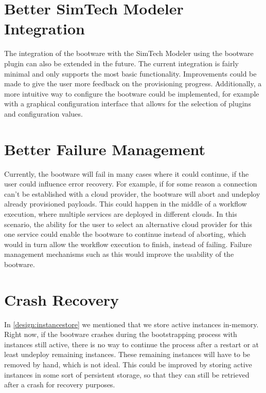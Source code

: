 \section{Better SimTech Modeler Integration}

The integration of the bootware with the SimTech Modeler using the bootware plugin can also be extended in the future.
The current integration is fairly minimal and only supports the most basic functionality.
Improvements could be made to give the user more feedback on the provisioning progress.
Additionally, a more intuitive way to configure the bootware could be implemented, for example with a graphical configuration interface that allows for the selection of plugins and configuration values.

\section{Better Failure Management}

Currently, the bootware will fail in many cases where it could continue, if the user could influence error recovery.
For example, if for some reason a connection can't be established with a cloud provider, the bootware will abort and undeploy already provisioned payloads.
This could happen in the middle of a workflow execution, where multiple services are deployed in different clouds.
In this scenario, the ability for the user to select an alternative cloud provider for this one service could enable the bootware to continue instead of aborting, which would in turn allow the workflow execution to finish, instead of failing.
Failure management mechanisms such as this would improve the usability of the bootware.

\section{Crash Recovery}

In \autoref{design:instancestore} we mentioned that we store active instances in-memory.
Right now, if the bootware crashes during the bootstrapping process with instances still active, there is no way to continue the process after a restart or at least undeploy remaining instances.
These remaining instances will have to be removed by hand, which is not ideal.
This could be improved by storing active instances in some sort of persistent storage, so that they can still be retrieved after a crash for recovery purposes.

